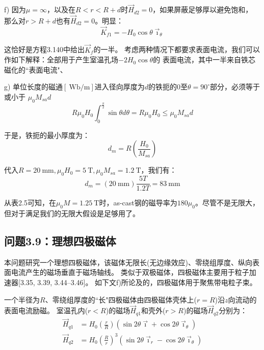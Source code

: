 f) 因为$\mu=\infty$，以及在$R< r< R+d$时$\vec{H}_{d2}=0$，如果屏蔽足够厚以避免饱和，
那么对$r>R+d$也有$\vec{H}_{d2}=0$。明显：
\begin{equation*}
\vec{K}_{f1}=-H_{0}\cos\theta\vec{\imath}_{\theta}\tag{S8.5}%
\end{equation*}

这恰好是方程3.140中给出$\vec{K}_f$的一半。
考虑两种情况下都要求表面电流，我们可以作如下解释：全部用于产生室温孔场$-2H_0\cos\theta$的
表面电流，其中一半来自铁芯磁化的``表面电流"、

g) 单位长度的磁通$[\ \mathrm{Wb/m}]$进入径向厚度为$d$的铁扼的0至$\theta=90^\circ$部分，必须等于或小于
$\mu_0 M_{sa}d$
\begin{equation*}
R\mu_{0}H_{0}\int_{0}^{\frac{\pi}{2}}\sin\theta d\theta=R\mu_{0}H_{0}\leq\mu_{0}M_{sa}d\tag{S8.6}%
\end{equation*}

于是，铁扼的最小厚度为：
\begin{equation*}
d_{m}=R(\frac{H_{0}}{M_{sa}})\tag{3.144}%
\end{equation*}

代入$R=20\ \mathrm{mm}, \mu_0 H_0=5\ \mathrm{T}, \mu_0 M_{sa}=1.2\ \mathrm{T}$，我们有：
\begin{equation*}
d_{m}=(20\ \mathrm{mm})\frac{5T}{1.2T}=83\ \mathrm{mm} 
\end{equation*}

从表2.5可知，在$\mu_0 M=1.25\ \mathrm{T}$时，as-cast钢的磁导率为$180\mu_0$。尽管不是无限大，
但对于满足我们的无限大假设是足够用了。

\subsection{问题3.9：理想四极磁体}
本问题研究一个理想四极磁体，该磁体无限长(无边缘效应)、零绕组厚度、纵向表面电流产生的磁场垂直于磁场轴线。
类似于双极磁体，四极磁体主要用于粒子加速器[3.35, 3.39, 3.44–3.46]。
如下文f)所论及的，四极磁体用于聚焦带电粒子束。

一个半径为$R$、零绕组厚度的``长"四极磁体由四极磁体壳体上($r=R$)沿$z$向流动的表面电流励磁。
室温孔内($r<R$)的磁场$\vec{H}_{q1}$和壳外($r>R$)的磁场$\vec{H}_{q2}$分别为：
\begin{subequations}
	\begin{align}
\vec{H}_{q1}&=H_{0}\left(\frac{r}{R}\right)(\sin 2\theta\vec{\imath}+\cos 2\theta\vec{\imath}_{\theta})\\%
\vec{H}_{q2}&=H_{0}\left(\frac{R}{r}\right)^{3}(\sin 2\theta\vec{\imath}_{r}-\cos 2\theta\vec{\imath}_{\theta})%
	\end{align}
\end{subequations}

